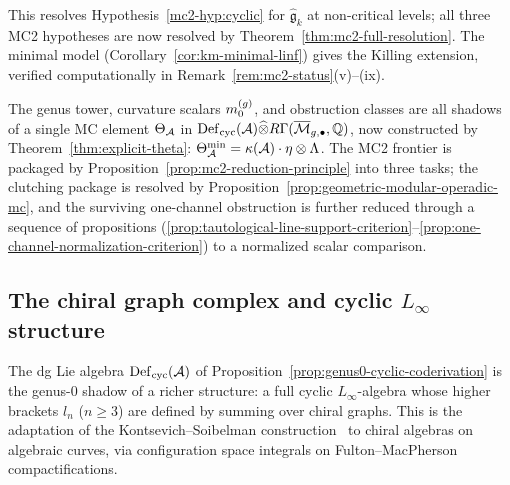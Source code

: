 \begin{remark}
\label{rem:mc2-1-km-scope}
This resolves Hypothesis~\ref{mc2-hyp:cyclic} for
$\widehat{\mathfrak{g}}_k$ at non-critical levels; all three MC2
hypotheses are now resolved by
Theorem~\ref{thm:mc2-full-resolution}.  The minimal model
(Corollary~\ref{cor:km-minimal-linf}) gives the Killing extension,
verified computationally in Remark~\ref{rem:mc2-status}(v)--(ix).
\end{remark}

\begin{remark}\label{rem:def-cyc-role}
The genus tower, curvature scalars $m_0^{(g)}$, and obstruction
classes are all shadows of a single MC element $\Theta_{\mathcal{A}}$ in
$\operatorname{Def}_{\mathrm{cyc}}(\mathcal{A}) \widehat{\otimes}
R\Gamma(\overline{\mathcal{M}}_{g,\bullet}, \mathbb{Q})$,
now constructed by Theorem~\ref{thm:explicit-theta}:
$\Theta_{\mathcal{A}}^{\min} = \kappa(\mathcal{A}) \cdot \eta \otimes \Lambda$.
The MC2 frontier is packaged by
Proposition~\ref{prop:mc2-reduction-principle} into three tasks;
the clutching package is resolved by
Proposition~\ref{prop:geometric-modular-operadic-mc}, and the
surviving one-channel obstruction is further reduced through a
sequence of propositions
(\ref{prop:tautological-line-support-criterion}--\ref{prop:one-channel-normalization-criterion})
to a normalized scalar comparison.
\end{remark}

\subsection{The chiral graph complex and cyclic
\texorpdfstring{$L_\infty$}{L-infinity} structure}
\label{subsec:chiral-graph-complex}

The dg Lie algebra $\operatorname{Def}_{\mathrm{cyc}}(\mathcal{A})$ of
Proposition~\ref{prop:genus0-cyclic-coderivation} is the genus-$0$ shadow
of a richer structure: a full cyclic $L_\infty$-algebra whose higher
brackets $l_n$ ($n \geq 3$) are defined by summing over chiral
graphs.  This is the adaptation of the Kontsevich--Soibelman
construction~\cite{KontsevichSoibelman} to chiral algebras on algebraic
curves, via configuration space integrals on
Fulton--MacPherson compactifications.

